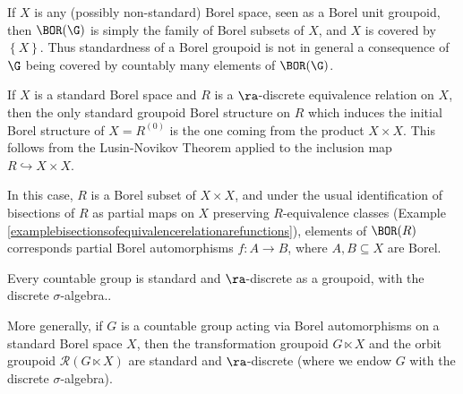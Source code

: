 \begin{remark}
If $X$ is any (possibly non-standard) Borel space, seen as a Borel unit groupoid, then $\BOR(\G)$ is simply the family of Borel subsets of $X$, and $X$ is covered by $\left\{X\right\}$. Thus standardness of a Borel groupoid is not in general a consequence of $\G$ being covered by countably many elements of $\BOR(\G)$.
\end{remark}

\begin{example}\label{exampleborelstructureequivalencerelationisunique}
If $X$ is a standard Borel space and $R$ is a $\ra$-discrete equivalence relation on $X$, then the only standard groupoid Borel structure on $R$ which induces the initial Borel structure of $X=R^{(0)}$ is the one coming from the product $X\times X$. This follows from the Lusin-Novikov Theorem applied to the inclusion map $R\hookrightarrow X\times X$.

In this case, $R$ is a Borel subset of $X\times X$, and under the usual identification of bisections of $R$ as partial maps on $X$ preserving $R$-equivalence classes (Example \ref{examplebisectionsofequivalencerelationarefunctions}), elements of $\BOR(R)$ corresponds partial Borel automorphisms $f:A\to B$, where $A,B\subseteq X$ are Borel.
\end{example}

\begin{example}
Every countable group is standard and $\ra$-discrete as a groupoid, with the discrete $\sigma$-algebra..
\end{example}

\begin{example}
More generally, if $G$ is a countable group acting via Borel automorphisms on a standard Borel space $X$, then the transformation groupoid $G\ltimes X$ and the orbit groupoid $\mathcal{R}(G\ltimes X)$ are standard and $\ra$-discrete (where we endow $G$ with the discrete $\sigma$-algebra).
\end{example}

